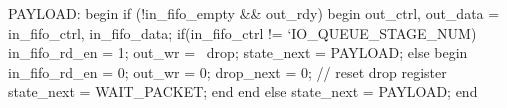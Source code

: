 \begin{verilogcode}
      PAYLOAD: begin
         if (!in_fifo_empty && out_rdy) begin
            {out_ctrl, out_data} = {in_fifo_ctrl, in_fifo_data};
            if(in_fifo_ctrl != `IO_QUEUE_STAGE_NUM)
                in_fifo_rd_en = 1;
                out_wr = ~drop;
                state_next = PAYLOAD;
            else begin
               in_fifo_rd_en = 0;
               out_wr = 0;
               drop_next = 0;            // reset drop register
               state_next = WAIT_PACKET;
            end
         end
         else
            state_next = PAYLOAD;
      end
\end{verilogcode}


